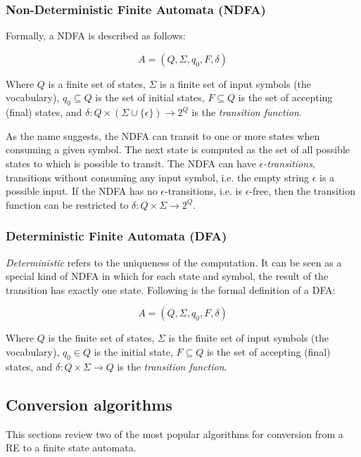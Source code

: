 \subsubsection{Non-Deterministic Finite Automata (NDFA)} Formally, a NDFA is described as follows:  

\begin{equation*}
    A = (Q,\Sigma,q_0,F,\delta)
\end{equation*}

Where $Q$ is a finite set of states, $\Sigma$ is a finite set of input symbols (the vocabulary), $q_0 \subseteq Q$ is the set of initial states, $F \subseteq Q$ is the set of accepting (final) states, and $\delta : Q \times (\Sigma \cup \{\epsilon\}) \rightarrow 2^Q$ is the \textit{transition function}. 

As the name suggests, the NDFA can transit to one or more states when consuming a given symbol. The next state is computed as the set of all possible states to which is possible to transit. The NDFA can have \textit{$\epsilon$-transitions}, transitions without consuming any input symbol, i.e. the empty string $\epsilon$ is a possible input. 
If the NDFA has no $\epsilon$-transitions, i.e. is $\epsilon$-free, then the transition function can be restricted to $\delta : Q \times \Sigma \rightarrow 2^Q$.

\subsubsection{Deterministic Finite Automata (DFA)} \textit{Deterministic} refers to the uniqueness of the computation. It can be seen as a special kind of NDFA in which for each state and symbol, the result of the transition has exactly one state. Following is the formal definition of a DFA:

\begin{equation*}
    A = (Q,\Sigma,q_0,F,\delta)
\end{equation*}

Where $Q$ is the finite set of states, $\Sigma$ is the finite set of input symbols (the vocabulary), $q_0 \in Q$ is the initial state, $F \subseteq Q$ is the set of accepting (final) states, and $\delta : Q \times \Sigma \rightarrow Q$ is the \textit{transition function}. 

\subsection{Conversion algorithms}
\label{convert}
This sections review two of the most popular algorithms for conversion from a RE to a finite state automata. 

